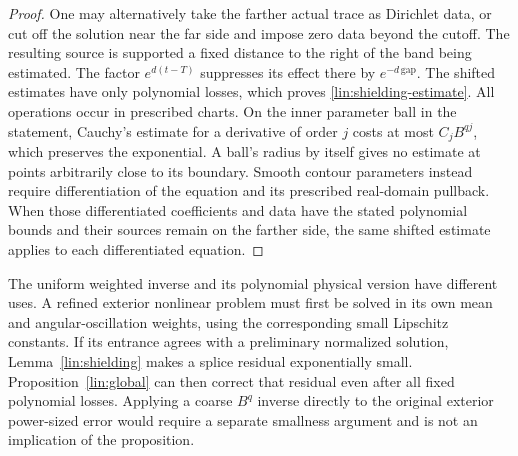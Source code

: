 \begin{proof}
One may alternatively take the farther actual trace as Dirichlet
data, or cut off the solution near the far side and impose zero data
beyond the cutoff.  The resulting source is supported a fixed distance
to the right of the band being estimated.  The factor
$e^{d(t-T)}$ suppresses its effect there by $e^{-d\,\mathrm{gap}}$.
The shifted estimates have only polynomial losses, which proves
\eqref{lin:shielding-estimate}.  All operations occur in prescribed
charts.  On the inner parameter ball in the statement, Cauchy's estimate
for a derivative of order $j$ costs at most $C_jB^{qj}$, which preserves
the exponential.  A ball's radius by itself gives no estimate at points
arbitrarily close to its boundary.  Smooth contour parameters instead
require differentiation of the equation and its prescribed real-domain
pullback.  When those differentiated coefficients and data have the
stated polynomial bounds and their sources remain on the farther side,
the same shifted estimate applies to each differentiated equation.
\end{proof}

\begin{remark}\label{lin:two-inversions}
The uniform weighted inverse and its polynomial physical version have
different uses.  A refined exterior nonlinear problem must first be
solved in its own mean and angular-oscillation weights, using the
corresponding small Lipschitz constants.  If its entrance agrees with
a preliminary normalized solution, Lemma~\ref{lin:shielding} makes a
splice residual exponentially small.  Proposition~\ref{lin:global}
can then correct that residual even after all fixed polynomial losses.
Applying a coarse $B^q$ inverse directly to the original exterior
power-sized error would require a separate smallness argument and is
not an implication of the proposition.
\end{remark}
